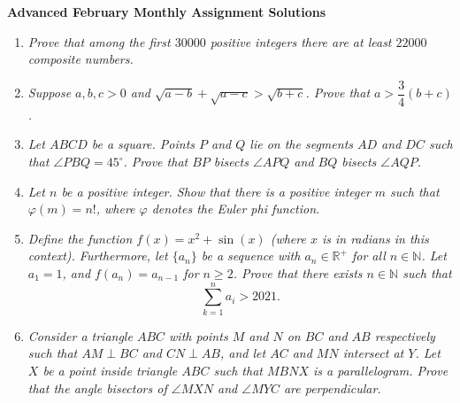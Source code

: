\documentclass{article}
\begin{document}
\thispagestyle{empty}

\begin{center}
  \textbf{\Large Advanced February Monthly Assignment Solutions}
\end{center}

\vspace{12pt}

\begin{enumerate}[1.]

\vspace{24pt}
\item %
{\itshape Prove that among the first $30000$ positive integers there are at least $22000$ composite numbers.}


\vspace{24pt}
\item %
{\itshape Suppose $a,b,c > 0$ and $\sqrt{a-b} +\sqrt{a-c} > \sqrt{b+c}$. Prove that $a > \dfrac{3}{4} (b+c)$.}


\vspace{24pt}
\item %
{\itshape Let $ABCD$ be a square.
Points $P$ and $Q$ lie on the segments $AD$ and $DC$ such that $\angle PBQ = 45^\circ$.
Prove that $BP$ bisects $\angle APQ$ and $BQ$ bisects $\angle AQP$.}


\vspace{24pt}
\item %
{\itshape Let $n$ be a positive integer. Show that there is a positive integer $m$ such that $\varphi(m) = n!$, where $\varphi$ denotes the Euler phi function.}


\vspace{24pt}
\item %
{\itshape Define the function $f(x) = x^2 + \sin(x)$ (where $x$ is in radians in this context). Furthermore, let $\{a_n\}$ be a sequence with $a_n \in \mathbb{R}^+$ for all $n \in \mathbb{N}$. Let $a_1 = 1$, and $f(a_n) = a_{n - 1}$ for $n \ge 2$. Prove that there exists $n \in \mathbb{N}$ such that 
$$\sum_{k = 1}^n a_i > 2021.$$}


\vspace{24pt}
\item %
{\itshape Consider a triangle $ABC$ with points $M$ and $N$ on $BC$ and $AB$ respectively such that $AM \perp BC$ and $CN \perp AB$, and let $AC$ and $MN$ intersect at $Y$.
Let $X$ be a point inside triangle $ABC$ such that $MBNX$ is a parallelogram.
Prove that the angle bisectors of $\angle MXN$ and $\angle MYC$ are perpendicular.}


\end{enumerate}
\end{document}
